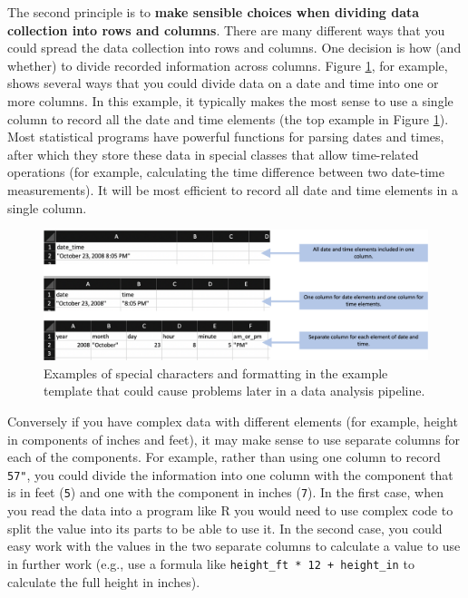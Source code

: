 \documentclass[]{tufte-book}
\begin{document}
The second principle is to \textbf{make sensible choices when dividing data collection
into rows and columns}. There are many different ways that you could spread the
data collection into rows and columns. One decision is how (and whether) to
divide recorded information across columns. Figure \ref{fig:arrangingcolumns},
for example, shows several ways that you could divide data on a date and time
into one or more columns. In this example, it typically makes the most sense
to use a single column to record all the date and time elements (the top example
in Figure \ref{fig:arrangingcolumns}). Most statistical programs have powerful
functions for parsing dates and times, after which they store these data in special
classes that allow time-related operations (for example, calculating the time difference
between two date-time measurements). It will be most efficient to record all date and
time elements in a single column.

\begin{figure}
\includegraphics[width=\textwidth]{figures/arranging_columns} \caption[Examples of special characters and formatting in the example template that could cause problems later in a data analysis pipeline]{Examples of special characters and formatting in the example template that could cause problems later in a data analysis pipeline.}\label{fig:arrangingcolumns}
\end{figure}

Conversely if you have complex data with different elements
(for example, height in components of inches and feet), it may make
sense to use separate columns for each of the components. For
example, rather than using one column to record \texttt{5\textquotesingle{}7"}, you
could divide the information into one column with the component
that is in feet (\texttt{5}) and one with the component in inches (\texttt{7}).
In the first case, when you read the data into a program like
R you would need to use complex code to split the value into
its parts to be able to use it. In the second case, you could
easy work with the values in the two separate columns to calculate
a value to use in further work (e.g., use a formula like
\texttt{height\_ft\ *\ 12\ +\ height\_in} to calculate the full height in inches).
\end{document}
